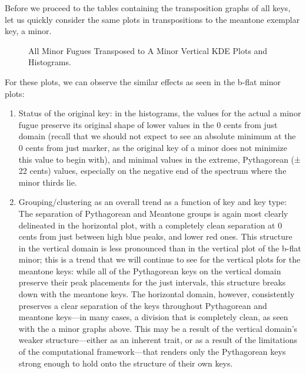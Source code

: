 Before we proceed to the tables containing the transposition graphs of
all keys, let us quickly consider the same plots in transpositions to
the meantone exemplar key, a minor.


    \begin{center}
    \end{center}
    


\begin{figure}[H]
    \begin{center}
    \caption{All Minor Fugues Transposed to A Minor Vertical KDE Plots and Histograms. }
    \end{center}
\end{figure}
    
    For these plots, we can observe the similar effects as seen in the
b-flat minor plots:

\begin{enumerate}
\def\labelenumi{\arabic{enumi}.}
\tightlist
\item
  Status of the original key: in the histograms, the values for the
  actual a minor fugue preserve its original shape of lower values in
  the 0 cents from just domain (recall that we should not expect to see
  an absolute minimum at the 0 cents from just marker, as the original
  key of a minor does not minimize this value to begin with), and
  minimal values in the extreme, Pythagorean (± 22 cents) values,
  especially on the negative end of the spectrum where the minor thirds
  lie.
\item
  Grouping/clustering as an overall trend as a function of key and key
  type: The separation of Pythagorean and Meantone groups is again most
  clearly delineated in the horizontal plot, with a completely clean
  separation at 0 cents from just between high blue peaks, and lower red
  ones. This structure in the vertical domain is less pronounced than in
  the vertical plot of the b-flat minor; this is a trend that we will
  continue to see for the vertical plots for the meantone keys: while
  all of the Pythagorean keys on the vertical domain preserve their peak
  placements for the just intervals, this structure breaks down with the
  meantone keys. The horizontal domain, however, consistently preserves
  a clear separation of the keys throughout Pythagorean and meantone
  keys---in many cases, a division that is completely clean, as seen
  with the a minor graphs above. This may be a result of the vertical
  domain's weaker structure---either as an inherent trait, or as a
  result of the limitations of the computational framework---that
  renders only the Pythagorean keys strong enough to hold onto the
  structure of their own keys.
\end{enumerate}

